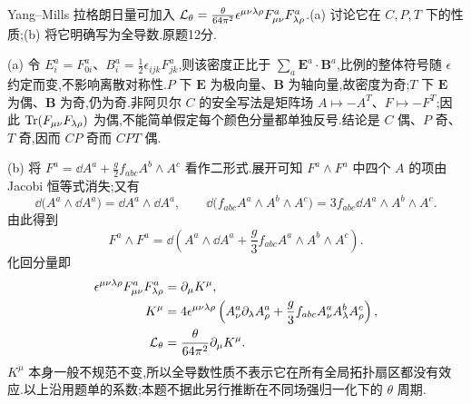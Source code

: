 \begin{exercise}
Yang--Mills 拉格朗日量可加入 $\mathcal L_\theta=\frac\theta{64\pi^2}\epsilon^{\mu\nu\lambda\rho}F_{\mu\nu}^aF_{\lambda\rho}^a$.(a) 讨论它在 $C,P,T$ 下的性质;(b) 将它明确写为全导数.原题12分.
\end{exercise}
\begin{solution}
(a) 令 $E_i^a=F_{0i}^a$、$B_i^a=\frac12\epsilon_{ijk}F_{jk}^a$,则该密度正比于 $\sum_a\mathbf E^a\cdot\mathbf B^a$,比例的整体符号随 $\epsilon$ 约定而变,不影响离散对称性.$P$ 下 $\mathbf E$ 为极向量、$\mathbf B$ 为轴向量,故密度为奇;$T$ 下 $\mathbf E$ 为偶、$\mathbf B$ 为奇,仍为奇.非阿贝尔 $C$ 的安全写法是矩阵场 $A\mapsto-A^T$、$F\mapsto-F^T$;因此 $\operatorname{Tr}(F_{\mu\nu}F_{\lambda\rho})$ 为偶,不能简单假定每个颜色分量都单独反号.结论是 $C$ 偶、$P$ 奇、$T$ 奇,因而 $CP$ 奇而 $CPT$ 偶.

(b) 将 $F^a=\dd A^a+\frac g2f_{abc}A^b\wedge A^c$ 看作二形式.展开可知 $F^a\wedge F^a$ 中四个 $A$ 的项由 Jacobi 恒等式消失;又有
\[
\dd\bigl(A^a\wedge\dd A^a\bigr)=\dd A^a\wedge\dd A^a,
\qquad
\dd\bigl(f_{abc}A^a\wedge A^b\wedge A^c\bigr)
=3f_{abc}\dd A^a\wedge A^b\wedge A^c.
\]
由此得到
\[
F^a\wedge F^a=
\dd\left(A^a\wedge\dd A^a+\frac g3f_{abc}A^a\wedge A^b\wedge A^c\right).
\]
化回分量即
\begin{align*}
\epsilon^{\mu\nu\lambda\rho}F_{\mu\nu}^aF_{\lambda\rho}^a&=\partial_\mu K^\mu,\\
K^\mu&=4\epsilon^{\mu\nu\lambda\rho}
\left(A_\nu^a\partial_\lambda A_\rho^a+
\frac g3f_{abc}A_\nu^aA_\lambda^bA_\rho^c\right),\\
\mathcal L_\theta&=\frac\theta{64\pi^2}\partial_\mu K^\mu.
\end{align*}
$K^\mu$ 本身一般不规范不变,所以全导数性质不表示它在所有全局拓扑扇区都没有效应.以上沿用题单的系数;本题不据此另行推断在不同场强归一化下的 $\theta$ 周期.
\end{solution}


